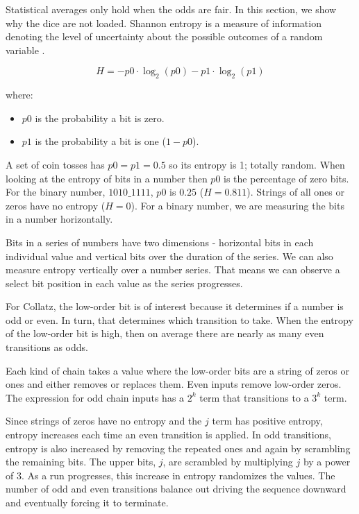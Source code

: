 \documentclass[letterpaper]{article}
\begin{document}
Statistical averages only hold when the odds are fair. In this section, we show why the dice are not loaded. Shannon entropy is a measure of information denoting the level of uncertainty about the possible outcomes of a random variable \cite{1}.

\[
H = -p0 \cdot \log_2(p0) - p1 \cdot \log_2(p1)
\]

where:
\begin{itemize}
    \item $p0$ is the probability a bit is zero.
    \item $p1$ is the probability a bit is one ($1 - p0$).
\end{itemize}

A set of coin tosses has $p0 = p1 = 0.5$ so its entropy is 1; totally random. When looking at the entropy of bits in a number then $p0$ is the percentage of zero bits. For the binary number, $1010\_1111$, $p0$ is $0.25$ ($H = 0.811$). Strings of all ones or zeros have no entropy ($H = 0$). For a binary number, we are measuring the bits in a number horizontally.

Bits in a series of numbers have two dimensions - horizontal bits in each individual value and vertical bits over the duration of the series. We can also measure entropy vertically over a number series. That means we can observe a select bit position in each value as the series progresses.

For Collatz, the low-order bit is of interest because it determines if a number is odd or even. In turn, that determines which transition to take. When the entropy of the low-order bit is high, then on average there are nearly as many even transitions as odds.

Each kind of chain takes a value where the low-order bits are a string of zeros or ones and either removes or replaces them. Even inputs remove low-order zeros. The expression for odd chain inputs has a $2^k$ term that transitions to a $3^k$ term.

Since strings of zeros have no entropy and the $j$ term has positive entropy, entropy increases each time an even transition is applied. In odd transitions, entropy is also increased by removing the repeated ones and again by scrambling the remaining bits. The upper bits, $j$, are scrambled by multiplying $j$ by a power of 3. As a run progresses, this increase in entropy randomizes the values. The number of odd and even transitions balance out driving the sequence downward and eventually forcing it to terminate.
\end{document}
